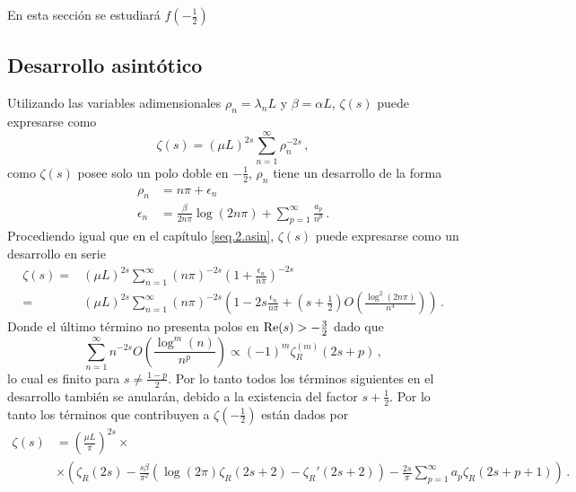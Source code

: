 En esta sección se estudiará $ f \left( - \frac{1}{2} \right)$

\subsection{Desarrollo asintótico}

Utilizando las variables adimensionales $\rho _n = \lambda _n L$ y $\beta = \alpha L$, $\zeta (s)$ puede expresarse como
\begin{equation}
\zeta (s) = \left( \mu L \right) ^{2s} \sum _{n=1} ^{\infty} \rho _n ^{-2s} 
\, ,
\end{equation}
como $\zeta (s)$ posee solo un polo doble en $-\frac{1}{2}$, $\rho _n$ tiene un desarrollo de la forma
\begin{equation}
\begin{aligned}
\rho _n  &= 
			n \pi + \epsilon _n \\
			\epsilon _n &= 
			\frac{ \beta }{2 n \pi } \log (2 n \pi) +
			\sum _{p=1} ^{\infty} \frac{a _p}{n ^p }
			\, .
\end{aligned}
\end{equation}
Procediendo igual que en el capítulo \ref{seq.2.asin}, $\zeta (s)$ puede expresarse como un desarrollo en serie
\begin{equation}
\begin{aligned}
\zeta (s) =& 
( \mu L ) ^{2s}
\sum _{n=1} ^{\infty}
( n \pi) ^{-2s} \left( 1 + \frac{ \epsilon _n }{n \pi } \right) ^{-2s } \\
 =& 
(\mu L) ^{2s} \sum _{n=1} ^{\infty}
( n \pi) ^{-2s} \left(
						1 -2s  \frac{\epsilon _n}{n \pi} + 
						\left( s + \frac{1}{2} \right) 
						O \left( \frac{ \log ^2 ( 2 n \pi ) }{ n ^4} \right)  
						\right)
\, .
\end{aligned}
\end{equation}
Donde el último término no presenta polos en \mbox{${\rm Re}(s) >- \frac{3}{2}$} dado que
\begin{equation} 
	\sum _{n=1} ^{\infty}
	 n  ^{-2s} O \left( \frac{ \log ^m (n)}{ n ^p} \right)
	\propto 
		(-1) ^m \zeta _R ^{(m)} (2s+p) 
\, ,
\end{equation}
lo cual es finito para $s \neq \frac{1-p}{2}$.
Por lo tanto todos los términos siguientes en el desarrollo también se anularán, debido a la existencia del factor $s + \frac{1}{2}$.
Por lo tanto los términos que contribuyen a $\zeta \left( - \frac{1}{2} \right)$ están dados por
\begin{align}
\zeta (s) &= \left( \frac{\mu L}{\pi} \right) ^{2s} \times \\
			\nonumber
			&\times
			\left(
					\zeta _R (2s) - \frac{s \beta}{\pi ^2} 
						\left(
							\log (2 \pi ) \zeta _R (2s+2) - \zeta _R '(2s+2)
							\right)-
					\frac{2 s}{\pi} \sum _{p=1} ^{\infty}
						a _p \zeta _R (2s+p+1)
					\right)
\, .					
\end{align}
